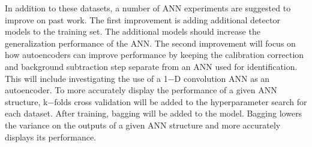 \documentclass[tocnosub,noragright,centerchapter,12pt,fullpage]{uiucecethesis09}
\begin{document}
In addition to these datasets, a number of ANN experiments are suggested to improve on past work. The first improvement is adding additional detector models to the training set. The additional models should increase the generalization performance of the ANN. The second improvement will focus on how autoencoders can improve performance by keeping the calibration correction and background subtraction step separate from an ANN used for identification. This will include investigating the use of a 1$-$D convolution ANN as an autoencoder. To more accurately display the performance of a given ANN structure, k$-$folds cross validation will be added to the hyperparameter search for each dataset. After training, bagging  will be added to the model. Bagging lowers the variance on the outputs of a given ANN structure and more accurately displays its performance.










\end{document}

